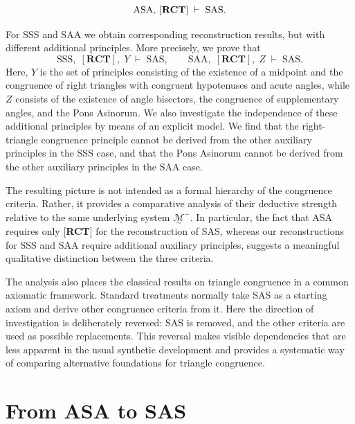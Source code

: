\documentclass[11pt,a4paper]{article}
\theoremstyle{definition}
\theoremstyle{remark}
\numberwithin{equation}{section}
\newcommand{\MG}{\underset{\sim}{\mathcal{M}}} %
\begin{document}
\begin{equation*}
\textrm{ASA, [\textbf{RCT}]}\;\vdash\;\textrm{SAS}.
\end{equation*}

For SSS and SAA we obtain corresponding reconstruction results, but with different additional principles. More precisely, we prove that
\begin{equation*}
\textrm{SSS},\;[\textbf{RCT}],\;Y\;\vdash\;\textrm{SAS},
\qquad
\textrm{SAA},\;[\textbf{RCT}],\;Z\;\vdash\;\textrm{SAS}.
\end{equation*}
Here, $Y$ is the set of principles consisting of the existence of a midpoint and the congruence of right triangles with congruent hypotenuses and acute angles, while $Z$ consists of the existence of angle bisectors, the congruence of supplementary angles, and the Pons Asinorum. We also investigate the independence of these additional principles by means of an explicit model. We find that the right-triangle congruence principle cannot be derived from the other auxiliary principles in the SSS case, and that the Pons Asinorum cannot be derived from the other auxiliary principles in the SAA case.

The resulting picture is not intended as a formal hierarchy of the congruence criteria. Rather, it provides a comparative analysis of their deductive strength relative to the same underlying system $\MG^{-}$. In particular, the fact that ASA requires only [\textbf{RCT}] for the reconstruction of SAS, whereas our reconstructions for SSS and SAA require additional auxiliary principles, suggests a meaningful qualitative distinction between the three criteria.

The analysis also places the classical results on triangle congruence in a common axiomatic framework. Standard treatments normally take SAS as a starting axiom and derive other congruence criteria from it. Here the direction of investigation is deliberately reversed: SAS is removed, and the other criteria are used as possible replacements. This reversal makes visible dependencies that are less apparent in the usual synthetic development and provides a systematic way of comparing alternative foundations for triangle congruence.



\section{From ASA to SAS}\label{PEN_s2}
\end{document}
